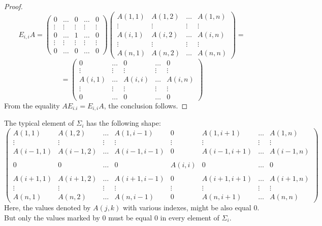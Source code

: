 \documentclass{article}
\theoremstyle{plain}
\theoremstyle{definition}
\begin{document}
\begin{proof}
$$ E_{i,i} A = 
\begin{pmatrix}
0 & \dots & 0 & \dots & 0\\
\vdots & \vdots & \vdots & \vdots & \vdots \\
0 & \dots &1 & \dots & 0\\
\vdots & \vdots & \vdots & \vdots & \vdots \\
0 & \dots & 0 & \dots & 0
\end{pmatrix}
\begin{pmatrix}
A(1,1) & A(1,2) & \dots & A(1,n) \\
\vdots & \vdots & \vdots & \vdots \\
A(i,1) & A(i,2) & \dots & A(i,n) \\
\vdots & \vdots & \vdots & \vdots \\
A(n,1) & A(n,2) & \dots & A(n,n) 
\end{pmatrix}
 = 
$$
$$ =
\begin{pmatrix}
0 & \dots & 0 & \dots & 0\\
\vdots & \vdots & \vdots & \vdots & \vdots\\
A(i,1) & \dots &A(i,i) & \dots & A(i,n)\\
\vdots & \vdots & \vdots & \vdots & \vdots \\
0 & \dots & 0 & \dots & 0
\end{pmatrix}
$$ 
From the equality $AE_{i.i} = E_{i,i} A$, the conclusion follows.
\end{proof}
The typical element of $\Sigma_i$ has the following shape:
$$
\begin{pmatrix}
A(1,1) & A(1,2) & \dots &A(1, i-1) & 0 & A(1, i+1) & \dots & A(1,n) \\
\vdots & \vdots & \vdots & \vdots & \vdots & \vdots &\vdots & \vdots \\
A(i-1,1) & A(i-1,2) & \dots &A(i-1, i-1) & 0 & A(i-1, i+1) & \dots & A(i-1,n) \\
&&&&&&& \\
0 & 0 & \dots &0 & A(i,i) & 0 & \dots & 0  \\
&&&&&&& \\
A(i+1,1) & A(i+1,2) & \dots &A(i+1, i-1) & 0 & A(i+1, i+1) & \dots & A(i+1,n) \\
\vdots & \vdots & \vdots & \vdots & \vdots & \vdots &\vdots & \vdots  \\
A(n,1) & A(n,2) & \dots & A(n,i-1) & 0  & A(n, i+1) & \dots & A(n,n)
\end{pmatrix}
$$
Here, the values denoted by $A(j,k)$ with various indexes, might be also equal $0$. But only the values marked by $0$ must be equal $0$ in every element of $\Sigma_i$. 
\end{document}
